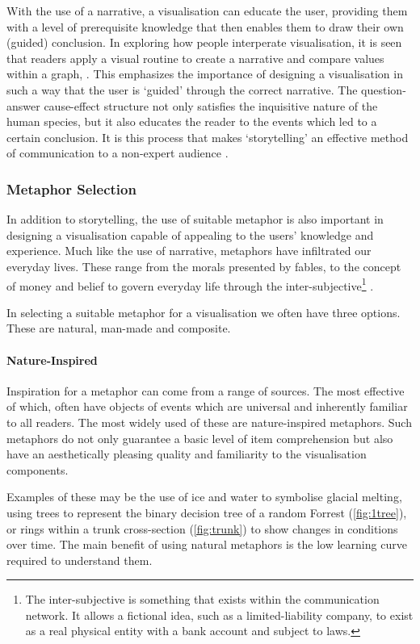 With the use of a narrative, a visualisation can educate the user, providing them with a level of prerequisite knowledge that then enables them to draw their own (guided) conclusion. In exploring how people interperate visualisation, it is seen that readers apply a visual routine to create a narrative and compare values within a graph, \citep{eyestory}. This emphasizes the importance of designing a visualisation in such a way that the user is `guided' through the correct narrative. The question-answer cause-effect structure not only satisfies the inquisitive nature of the human species, but it also educates the reader to the events which led to a certain conclusion. It is this process that makes `storytelling' an effective method of communication to a non-expert audience \citep{nonscientific}.


\subsubsection{Metaphor Selection}
In addition to storytelling, the use of suitable metaphor is also important in designing a visualisation capable of appealing to the users' knowledge and experience.  Much like the use of narrative, metaphors have infiltrated our everyday lives. These range from the morals presented by fables, to the concept of money and belief to govern everyday life through the inter-subjective\footnote{The inter-subjective is something that exists within the communication network. It allows a fictional idea, such as a limited-liability company, to exist as a real physical entity with a bank account and subject to laws. } \citep{sapiens}. 

In selecting a suitable metaphor for a visualisation we often have three options. These are natural, man-made and composite. 

\paragraph*{Nature-Inspired}
Inspiration for a metaphor can come from a range of sources. The most effective of which, often have objects of events which are universal and inherently familiar to all readers. The most widely used of these are nature-inspired metaphors. 
Such metaphors do not only guarantee a basic level of item comprehension but also have an aesthetically pleasing
quality and familiarity to the visualisation components. 

Examples of these may be the use of ice and water to symbolise glacial melting, using trees to represent the binary decision tree of a random Forrest (\autoref{fig:1tree}), or rings within a trunk cross-section (\autoref{fig:trunk}) to show changes in conditions over time. The main benefit of using natural metaphors is the low learning curve required to understand them. 



